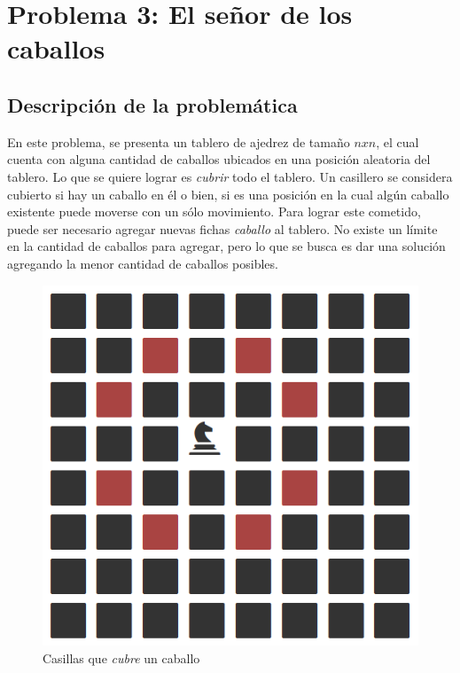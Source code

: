 \section{Problema 3: El se\~nor de los caballos}
\subsection{Descripci\'on de la problem\'atica}

En este problema, se presenta un tablero de ajedrez de tama\~no $nxn$, el cual cuenta con alguna cantidad de caballos ubicados en una posici\'on aleatoria del tablero. Lo que se quiere lograr es \emph{cubrir} todo el tablero. Un casillero se considera cubierto si hay un caballo en \'el o bien, si es una posici\'on en la cual alg\'un caballo existente puede moverse con un s\'olo movimiento. Para lograr este cometido, puede ser necesario agregar nuevas fichas \emph{caballo} al tablero. No existe un l\'imite en la cantidad de caballos para agregar, pero lo que se busca es dar una soluci\'on agregando la menor cantidad de caballos posibles.\\

 \begin{figure}[h!]
   \begin{center}
 	\includegraphics[scale=0.4]{imagenes/ej3/unCaballo.png}
 	\caption{Casillas que \emph{cubre} un caballo}
   \end{center}
 \end{figure}

